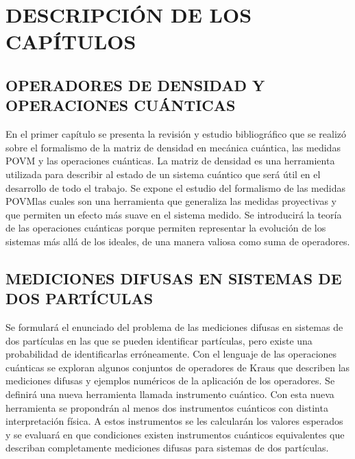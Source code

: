 \documentclass[12pt,oneside]{book}\raggedbottom{} %
\begin{document}
\begin{sloppypar}
{{%
\chapter{DESCRIPCIÓN DE LOS CAPÍTULOS}  %
\section{OPERADORES DE DENSIDAD Y OPERACIONES CUÁNTICAS}
En el primer capítulo  se presenta la revisión y estudio bibliográfico que se
realizó sobre el formalismo de la matriz de densidad en mecánica cuántica, las
medidas POVM y las operaciones cuánticas. La matriz de densidad es una
herramienta utilizada para describir al estado de un sistema cuántico que será
útil en el desarrollo de todo el trabajo.  Se expone el estudio del formalismo
de las medidas POVM\@ las cuales son una herramienta que generaliza las medidas
proyectivas y que permiten un efecto más suave en el sistema medido.  Se
introducirá la teoría de las operaciones cuánticas  porque permiten representar
la evolución de los sistemas más allá de los ideales, de una manera valiosa
como suma de operadores.

\section{MEDICIONES DIFUSAS EN SISTEMAS DE DOS PARTÍCULAS}
Se formulará el enunciado del problema de las mediciones difusas en sistemas de
dos partículas en las que se pueden identificar partículas, pero existe una
probabilidad de identificarlas erróneamente. Con el lenguaje de las operaciones
cuánticas se exploran algunos conjuntos de operadores de Kraus que describen
las mediciones difusas y ejemplos numéricos de la aplicación de los operadores.
Se definirá una nueva herramienta llamada instrumento cuántico. Con esta nueva herramienta se propondrán al menos dos instrumentos cuánticos con distinta interpretación física. A estos instrumentos se les calcularán los valores esperados y se evaluará en que condiciones existen instrumentos cuánticos equivalentes que describan completamente mediciones difusas para sistemas de dos partículas.



}}
\end{sloppypar}
\end{document}
